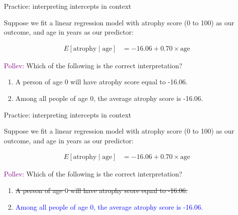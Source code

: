 \documentclass[10pt,t]{beamer}
\begin{document}
\begin{frame}{Practice: interpreting intercepts in context}

Suppose we fit a linear regression model with atrophy score (0 to 100) as our outcome, and age in years as our predictor:

\begin{align*}
E[\text{atrophy} \mid \text{age}] & = -16.06 + 0.70 \times \text{age}
\end{align*}

\textcolor{purple}{Pollev:} Which of the following is the correct interpretation?
\medskip

\begin{enumerate}
	\item A person of age $0$ will have atrophy score equal to -16.06.
	\item Among all people of age $0$, the average atrophy score is -16.06.
\end{enumerate}
\end{frame}

\begin{frame}{Practice: interpreting intercepts in context}
	
	Suppose we fit a linear regression model with atrophy score (0 to 100) as our outcome, and age in years as our predictor:
	
	\begin{align*}
	E[\text{atrophy} \mid \text{age}] & = -16.06 + 0.70 \times \text{age}
	\end{align*}
	
	\textcolor{purple}{Pollev:} Which of the following is the correct interpretation?
	\medskip
	
	\begin{enumerate}
		\item \sout{A person of age $0$ will have atrophy score equal to -16.06.}
		\item \textcolor{blue}{Among all people of age $0$, the average atrophy score is -16.06.}
	\end{enumerate}
\end{frame}
\end{document}

